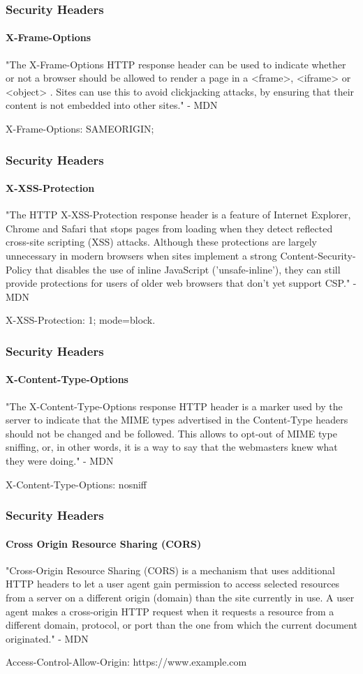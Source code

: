 \documentclass[aspectratio=169]{beamer}
\begin{document}
\begin{frame}
  \frametitle{Security Headers}
  \framesubtitle{X-Frame-Options}
  "The X-Frame-Options HTTP response header can be used to indicate whether or not a browser should be allowed to render a page in a <frame>, <iframe> or <object> . Sites can use this to avoid clickjacking attacks, by ensuring that their content is not embedded into other sites." - MDN\\
  \bigskip
  \begin{tcolorbox}[title=X-Frame-Options Header Example,colback=gray]
    X-Frame-Options: SAMEORIGIN;
  \end{tcolorbox}
\end{frame}
\begin{frame}
  \frametitle{Security Headers}
  \framesubtitle{X-XSS-Protection}
  "The HTTP X-XSS-Protection response header is a feature of Internet Explorer, Chrome and Safari that stops pages from loading when they detect reflected cross-site scripting (XSS) attacks. Although these protections are largely unnecessary in modern browsers when sites implement a strong Content-Security-Policy that disables the use of inline JavaScript ('unsafe-inline'), they can still provide protections for users of older web browsers that don't yet support CSP." - MDN\\
  \bigskip
  \begin{tcolorbox}[title=X-XSS-Protection Header Example,colback=gray]
    X-XSS-Protection: 1; mode=block.
  \end{tcolorbox}
\end{frame}
\begin{frame}
  \frametitle{Security Headers}
  \framesubtitle{X-Content-Type-Options}
  "The X-Content-Type-Options response HTTP header is a marker used by the server to indicate that the MIME types advertised in the Content-Type headers should not be changed and be followed. This allows to opt-out of MIME type sniffing, or, in other words, it is a way to say that the webmasters knew what they were doing." - MDN\\
  \bigskip
  \begin{tcolorbox}[title=X-Content-Type-Options Header Example,colback=gray]
    X-Content-Type-Options: nosniff
  \end{tcolorbox}
\end{frame}
\begin{frame}
  \frametitle{Security Headers}
  \framesubtitle{Cross Origin Resource Sharing (CORS)}
  "Cross-Origin Resource Sharing (CORS) is a mechanism that uses additional HTTP headers to let a user agent gain permission to access selected resources from a server on a different origin (domain) than the site currently in use. A user agent makes a cross-origin HTTP request when it requests a resource from a different domain, protocol, or port than the one from which the current document originated." - MDN\\
  \bigskip
  \begin{tcolorbox}[title=Access-Control-Allow-Origin Header Example,colback=gray]
    Access-Control-Allow-Origin: https://www.example.com
  \end{tcolorbox}
\end{frame}
\end{document}
